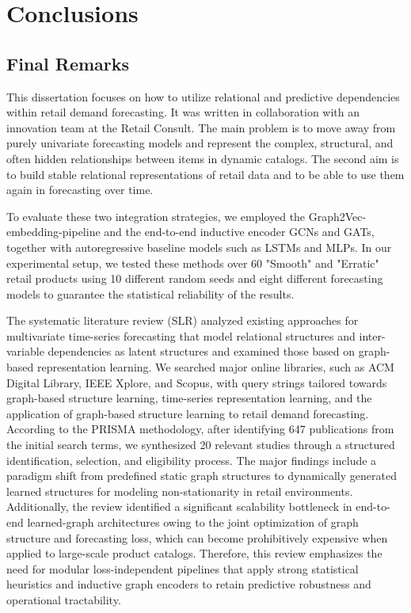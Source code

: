 \chapter{Conclusions}

\section{Final Remarks}

This dissertation focuses on how to utilize relational and predictive dependencies within retail demand forecasting. It was written in collaboration with an innovation team at the Retail Consult. The main problem is to move away from purely univariate forecasting models and represent the complex, structural, and often hidden relationships between items in dynamic catalogs. The second aim is to build stable relational representations of retail data and to be able to use them again in forecasting over time.

To evaluate these two integration strategies, we employed the Graph2Vec-embedding-pipeline and the end-to-end inductive encoder GCNs and GATs, together with autoregressive baseline models such as LSTMs and MLPs. In our experimental setup, we tested these methods over 60 "Smooth" and "Erratic" retail products using 10 different random seeds and eight different forecasting models to guarantee the statistical reliability of the results.


The systematic literature review (SLR) analyzed existing approaches for multivariate time-series forecasting that model relational structures and inter-variable dependencies as latent structures and examined those based on graph-based representation learning. We searched major online libraries, such as ACM Digital Library, IEEE Xplore, and Scopus, with query strings tailored towards graph-based structure learning, time-series representation learning, and the application of graph-based structure learning to retail demand forecasting. According to the PRISMA methodology, after identifying 647 publications from the initial search terms, we synthesized 20 relevant studies through a structured identification, selection, and eligibility process. The major findings include a paradigm shift from predefined static graph structures to dynamically generated learned structures for modeling non-stationarity in retail environments. Additionally, the review identified a significant scalability bottleneck in end-to-end learned-graph architectures owing to the joint optimization of graph structure and forecasting loss, which can become prohibitively expensive when applied to large-scale product catalogs. Therefore, this review emphasizes the need for modular loss-independent pipelines that apply strong statistical heuristics and inductive graph encoders to retain predictive robustness and operational tractability.

